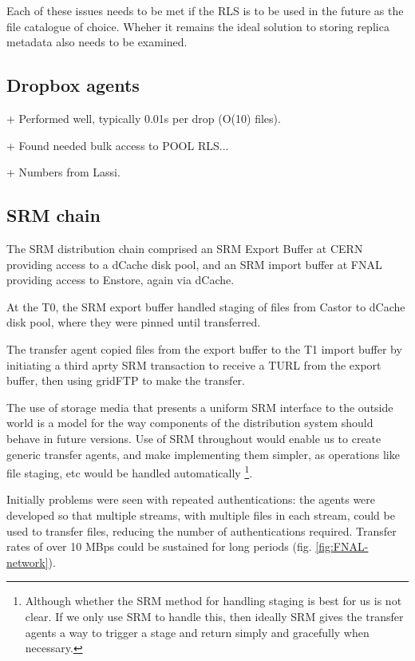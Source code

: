 \documentclass{cmspaper}
\begin{document}
Each of these issues needs to be met if the RLS is to be used in the future as the file catalogue of choice. Wheher it remains the ideal solution to storing replica metadata also needs to be examined.

\subsection{Dropbox agents}
+ Performed well, typically 0.01s per drop (O(10) files).

+ Found needed bulk access to POOL RLS...

+ Numbers from Lassi.

\subsection{SRM chain}
The SRM distribution chain comprised an SRM Export Buffer at CERN providing access to a dCache disk pool, and an SRM import buffer at FNAL providing access to Enstore, again via dCache. 

At the T0, the SRM export buffer handled staging of files from Castor to dCache disk pool, where they were pinned until transferred.

The transfer agent copied files from the export buffer to the T1 import buffer by initiating a third aprty SRM transaction to receive a TURL from the export buffer, then using gridFTP to make the transfer.

The use of storage media that presents a uniform SRM interface to the outside world is a model for the way components of the distribution system should behave in future versions. Use of SRM throughout would enable us to create generic transfer agents, and make implementing them simpler, as operations like file staging, etc would be handled automatically \footnote{Although whether the SRM method for handling staging is best for us is not clear. If we only use SRM to handle this, then ideally SRM gives the transfer agents a way to trigger a stage and return simply and gracefully when necessary.}.

Initially problems were seen with repeated authentications: the agents were developed so that multiple streams, with multiple files in each stream, could be used to transfer files, reducing the number of authentications required. Transfer rates of over 10 MBps could be sustained for long periods (fig. \ref{fig:FNAL-network}).
\end{document}
